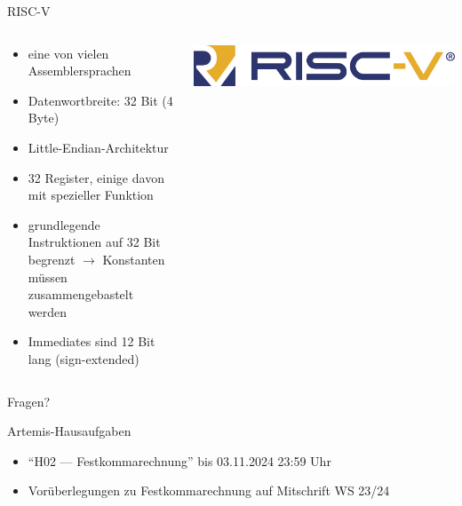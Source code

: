 \documentclass[
  german,            %
  aspectratio=169,    %
]{tumbeamer}
\begin{document}
\begin{frame}[c]{RISC-V}{}
  \begin{columns}[c]
    \begin{column}{0.6\textwidth}
      \begin{itemize}
        \item eine von vielen Assemblersprachen
        \item Datenwortbreite: 32 Bit (4 Byte)
        \item Little-Endian-Architektur
        \item 32 Register, einige davon mit spezieller Funktion
        \item grundlegende Instruktionen auf 32 Bit begrenzt 
        $\rightarrow$ Konstanten müssen zusammengebastelt werden
        \item Immediates sind 12 Bit lang (sign-extended)
      \end{itemize}
    \end{column}
    \begin{column}{0.3\textwidth}
      \includegraphics[width=\linewidth]{risc_v_logo.png}
    \end{column}
  \end{columns}
\end{frame}

\begin{frame}[c]{}{}
  \begin{center}
    \LARGE Fragen?
  \end{center}
\end{frame}


\begin{frame}[c]{Artemis-Hausaufgaben}{}
  \begin{itemize}
    \item \enquote{H02 --- Festkommarechnung} bis 03.11.2024 23:59 Uhr
    \item Vorüberlegungen zu Festkommarechnung auf Mitschrift WS 23/24
  \end{itemize}
\end{frame}
\end{document}
